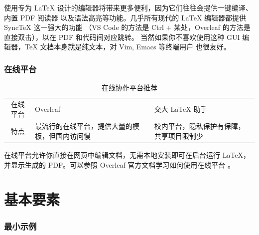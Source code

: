 \begin{shadedsection}
\begin{frame}
{  使用专为 \LaTeX{} 设计的编辑器将带来更多便利，因为它们往往会提供一键编译、内置 PDF 阅读器
  以及语法高亮等功能。几乎所有现代的 \LaTeX{} 编辑器都提供 Sync\TeX{} 这一强大的功能
  （VS Code 的方法是 Ctrl + 某处，Overleaf 的方法是直接双击），以在 PDF 和代码间对应跳转。
  当然如果你不喜欢使用这种 GUI 编辑器，\TeX{} 文档本身就是纯文本，对 Vim, Emacs 等终端用户
  也很友好。}
\end{frame}

\begin{frame}
  \frametitle{在线平台}
  \begin{table}
    \caption{在线协作平台推荐}
    \footnotesize
    \begin{stampbox}
      \begin{tabular}{c>{\raggedright}*{2}{p{4cm}}}
        \alert{在线平台}     & Overleaf   & 交大 \LaTeX{} 助手  \\[2pt]
        \alert{特点}      & 最流行的在线平台，提供大量的模板，但国内访问慢 & 校内平台，隐私保护有保障，共享项目限制少 \\
      \end{tabular}
    \end{stampbox}
  \end{table}
  \begin{center}
    \parbox{.9\textwidth}{
      在线平台允许你直接在网页中编辑文档，无需本地安装即可在后台运行 \LaTeX{}，并显示生成的 PDF。可以参照 Overleaf 官方文档学习如何使用在线平台 。
    }
  \end{center}
\end{frame}

\section{基本要素}

\begin{frame}[fragile]%
  \frametitle{最小示例}
  \begin{columns}[c]
    \begin{column}{0.4\textwidth}


\end{column}
\end{columns}
\end{frame}
\end{shadedsection}
